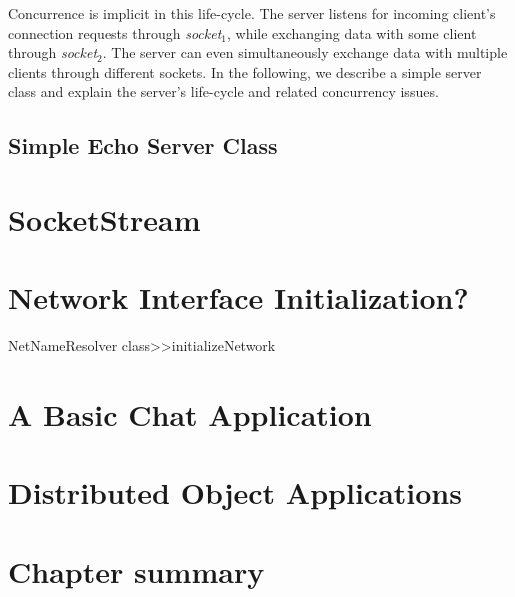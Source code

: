 \documentclass[a4paper,10pt,twoside]{book}
\begin{document}
Concurrence is implicit in this life-cycle.
The server listens for incoming client's connection requests through {\em socket$_1$}, while exchanging data with some client through {\em socket$_2$}.
The server can even simultaneously exchange data with multiple clients through different sockets.
In the following, we describe a simple server class and explain the server's life-cycle and related concurrency issues.

\subsection{Simple Echo Server Class}


\section{SocketStream}
\section{Network Interface Initialization?}
NetNameResolver class>>initializeNetwork
\section{A Basic Chat Application}
\section{Distributed Object Applications}
\section{Chapter summary}



\ifx\wholebook\relax\else
\end{document}
